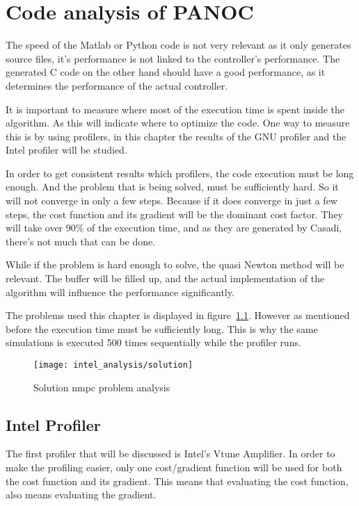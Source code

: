 \chapter{Code analysis of PANOC}
The speed of the Matlab or Python code is not very relevant as it only generates source files, it's performance is not linked to the controller's performance. The generated C code on the other hand should have a good performance, as it determines the performance of the actual controller.

It is important to measure where most of the execution time is spent inside the algorithm. As this will indicate where to optimize the code. One way to measure this is by using profilers, in this chapter the results of the GNU profiler and the Intel profiler will be studied.

In order to get consistent results which profilers, the code execution must be long enough. And the problem that is being solved, must be sufficiently hard. So it will not converge in only a few steps. Because if it does converge in just a few steps, the cost function and its gradient will be the dominant cost factor. They will take over 90\% of the execution time, and as they are generated by Casadi, there's not much that can be done.

While if the problem is hard enough to solve, the quasi Newton method will be relevant. The buffer will be filled up, and the actual implementation of the algorithm will influence the performance significantly.

The problems used this chapter is displayed in figure~\ref{fig:solution nmpc problem analysis}. However as mentioned before the execution time must be sufficiently long. This is why the same simulations is executed 500 times sequentially while the profiler runs.

\begin{figure}[H]
	\centering
	\texttt{[image: intel\_analysis/solution]}
	\caption{Solution nmpc problem analysis}
	\label{fig:solution nmpc problem analysis}
\end{figure}

\section{Intel Profiler}
The first profiler that will be discussed is Intel's Vtune Amplifier. In order to make the profiling easier, only one cost/gradient function will be used for both the cost function and its gradient. This means that evaluating the cost function, also means evaluating the gradient.

